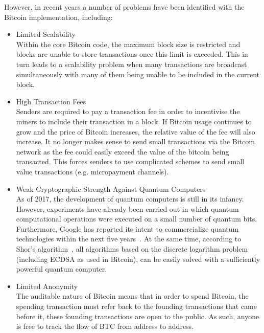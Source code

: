 \documentclass[a4paper,10pt,twocolumn]{article}
\begin{document}
However, in recent years a number of problems have been identified with the Bitcoin implementation, including:
\vspace{-0.5\baselineskip}
\begin{itemize}
	\setlength\itemsep{0em}
	\item{Limited Scalability}\mbox{}\\ 
	Within the core Bitcoin code, the maximum block size is restricted and blocks are unable to store transactions once this limit 
	is exceeded. This in turn leads to a scalability problem when many transactions are broadcast simultaneously with many of them 
	being unable to be included in the current block.
	\item{High Transaction Fees}\mbox{}\\ 
	Senders are required to pay a transaction fee in order to incentivise the miners to include their transaction in a block.
	If Bitcoin usage continues to grow and the price of Bitcoin increases, the relative value of the fee will also increase.
	It no longer makes sense to send small transactions via the Bitcoin network
	as the fee could easily exceed the value of the bitcoin being transacted. This forces senders to use complicated schemes to send small value transactions (e.g. 
	micropayment channels).
	\item{Weak Cryptographic Strength Against Quantum Computers}\\ 
	As of 2017, the development of quantum computers is still in its infancy. However, experiments have already been carried out in 
	which quantum computational operations were executed on a small number of quantum bits. Furthermore, Google has reported its 
	intent to commercialize quantum technologies within the next five years~\cite{google}. At the same time, according to Shor's 
	algorithm~\cite{shor}, all algorithms based on the discrete logarithm problem (including ECDSA as used in 
	Bitcoin), can be easily solved with a sufficiently powerful quantum computer. 
	\item{Limited Anonymity}\mbox{}\\ 
	The auditable nature of Bitcoin means that in order to spend Bitcoin, the spending transaction must refer back to the founding
	transactions that came before it, these founding transactions are open to the public. As such, anyone is free to track the flow
	of BTC from address to address.
\end{itemize}
\end{document}
